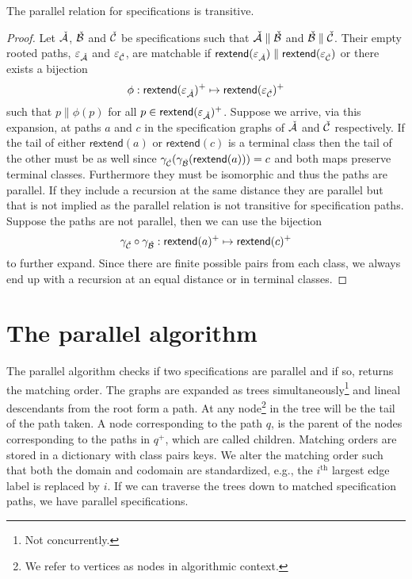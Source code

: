 \begin{proposition}
The parallel relation for specifications is transitive.
\end{proposition}
\begin{proof}
Let $\check{\mathcal{A}}$, $\check{\mathcal{B}}$ and $\check{\mathcal{C}}$ be specifications such that $\check{\mathcal{A}} \parallel\check{\mathcal{B}}$ and $\check{\mathcal{B}} \parallel \check{\mathcal{C}}$. Their empty rooted paths, $\varepsilon_{\check{\mathcal{A}}}$ and $\varepsilon_{\check{\mathcal{C}}}$, are matchable if $\textsf{rextend}(\varepsilon_{\check{\mathcal{A}}}) \parallel \textsf{rextend}(\varepsilon_{\check{\mathcal{C}}})$ or there exists a bijection
\[
    \phi: \textsf{rextend}(\varepsilon_{\check{\mathcal{A}}})^+ \mapsto \textsf{rextend}(\varepsilon_{\check{\mathcal{C}}})^+
\]
such that $p \parallel \phi(p)$ for all $p \in \textsf{rextend}(\varepsilon_{\check{\mathcal{A}}})^+$. Suppose we arrive, via this expansion, at paths $a$ and $c$ in the specification graphs of $\check{\mathcal{A}}$ and $\check{\mathcal{C}}$ respectively. If the tail of either $\textsf{rextend}(a)$ or $\textsf{rextend}(c)$ is a terminal class then the tail of the other must be as well since $\gamma_{\check{\mathcal{C}}}(\gamma_{\check{\mathcal{B}}}(\textsf{rextend}(a))) = c$ and both maps preserve terminal classes. Furthermore they must be isomorphic and thus the paths are parallel. If they include a recursion at the same distance they are parallel but that is not implied as the parallel relation is not transitive for specification paths. Suppose the paths are not parallel, then we can use the bijection
\[
    \gamma_{\check{\mathcal{C}}} \circ \gamma_{\check{\mathcal{B}}}: \textsf{rextend}(a)^+ \mapsto \textsf{rextend}(c)^+
\]
to further expand. Since there are finite possible pairs from each class, we always end up with a recursion at an equal distance or in terminal classes.
\end{proof}



\section{The parallel algorithm}\label{sec:paralg}
The parallel algorithm checks if two specifications are parallel and if so, returns the matching order. The graphs are expanded as trees simultaneously\footnote{Not concurrently.} and lineal descendants from the root form a path. At any node\footnote{We refer to vertices as nodes in algorithmic context.} in the tree will be the tail of the path taken. A node corresponding to the path $q$, is the parent of the nodes corresponding to the paths in $q^+$, which are called children. Matching orders are stored in a dictionary with class pairs keys. We alter the matching order such that both the domain and codomain are standardized, e.g., the $i^\text{th}$ largest edge label is replaced by $i$. If we can traverse the trees down to matched specification paths, we have parallel specifications.

